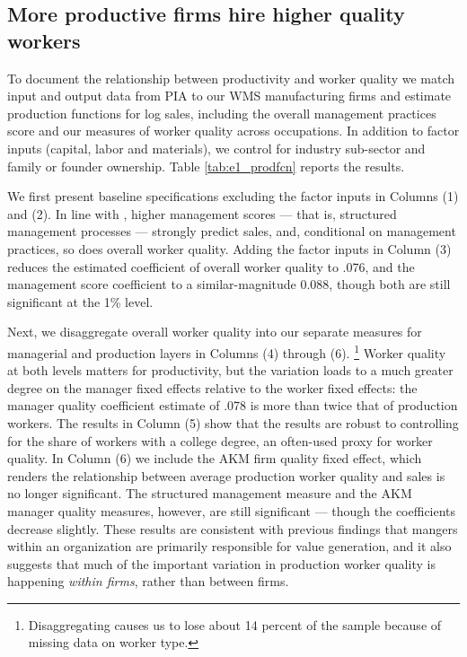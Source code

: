 
\subsection{More productive firms hire higher quality workers}
To document the relationship between productivity and worker quality we match input and output data from PIA to our WMS manufacturing firms and estimate production functions for log sales, including the overall management practices score and our measures of worker quality across occupations. In addition to factor inputs (capital, labor and materials), we control for industry sub-sector and family or founder ownership.  Table \ref{tab:e1_prodfcn} reports the results.  

We first present baseline specifications excluding the factor inputs in Columns (1) and (2). In line with \citet{Bender:Management:NBER:2016}, higher management scores --- that is, structured management processes --- strongly predict sales, and, conditional on management practices, so does overall worker quality. Adding the factor inputs in Column (3) reduces the estimated coefficient of overall worker quality to .076, and the management score coefficient to a similar-magnitude 0.088, though both are still significant at the 1\% level. 

Next, we disaggregate overall worker quality into our separate measures for managerial and production layers in Columns (4) through (6).%
\footnote{Disaggregating causes us to lose about 14 percent of the sample because of missing data on worker type.} Worker quality at both levels matters for productivity, but the variation loads to a much greater degree on the manager fixed effects relative to the worker fixed effects: the manager quality coefficient estimate of .078 is more than twice that of production workers. The results in Column (5) show that the results are robust to controlling for the share of workers with a college degree, an often-used proxy for worker quality. In Column (6) we include the AKM firm quality fixed effect, which renders the relationship between average production worker quality and sales is no longer significant. The structured management measure and the AKM manager quality measures, however, are still significant --- though the coefficients decrease slightly. These results are consistent with previous findings that mangers within an organization are primarily responsible for value generation, and it also suggests that much of the important variation in production worker quality is happening \textit{within firms}, rather than between firms. %

